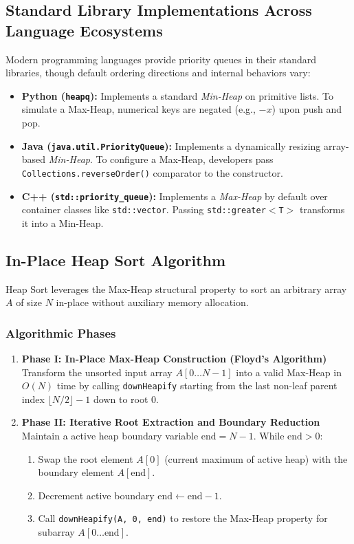 \documentclass[10pt,journal,compsoc,onecolumn]{IEEEtran}
\begin{document}
\subsection{Standard Library Implementations Across Language Ecosystems}

Modern programming languages provide priority queues in their standard libraries, though default ordering directions and internal behaviors vary:

\begin{itemize}
    \item \textbf{Python (\texttt{heapq}):} Implements a standard \emph{Min-Heap} on primitive lists. To simulate a Max-Heap, numerical keys are negated (e.g., $-x$) upon push and pop.
    \item \textbf{Java (\texttt{java.util.PriorityQueue}):} Implements a dynamically resizing array-based \emph{Min-Heap}. To configure a Max-Heap, developers pass \texttt{Collections.reverseOrder()} comparator to the constructor.
    \item \textbf{C++ (\texttt{std::priority\_queue}):} Implements a \emph{Max-Heap} by default over container classes like \texttt{std::vector}. Passing \texttt{std::greater$<$T$>$} transforms it into a Min-Heap.
\end{itemize}

\subsection{In-Place Heap Sort Algorithm}

Heap Sort leverages the Max-Heap structural property to sort an arbitrary array $A$ of size $N$ in-place without auxiliary memory allocation.

\subsubsection{Algorithmic Phases}
\begin{enumerate}
    \item \textbf{Phase I: In-Place Max-Heap Construction (Floyd's Algorithm)} \\
    Transform the unsorted input array $A[0 \dots N-1]$ into a valid Max-Heap in $O(N)$ time by calling \texttt{downHeapify} starting from the last non-leaf parent index $\lfloor N/2 \rfloor - 1$ down to root $0$.
    \item \textbf{Phase II: Iterative Root Extraction and Boundary Reduction} \\
    Maintain a active heap boundary variable $\text{end} = N - 1$. While $\text{end} > 0$:
    \begin{enumerate}
        \item Swap the root element $A[0]$ (current maximum of active heap) with the boundary element $A[\text{end}]$.
        \item Decrement active boundary $\text{end} \leftarrow \text{end} - 1$.
        \item Call \texttt{downHeapify(A, 0, end)} to restore the Max-Heap property for subarray $A[0 \dots \text{end}]$.
    \end{enumerate}
\end{enumerate}
\end{document}
